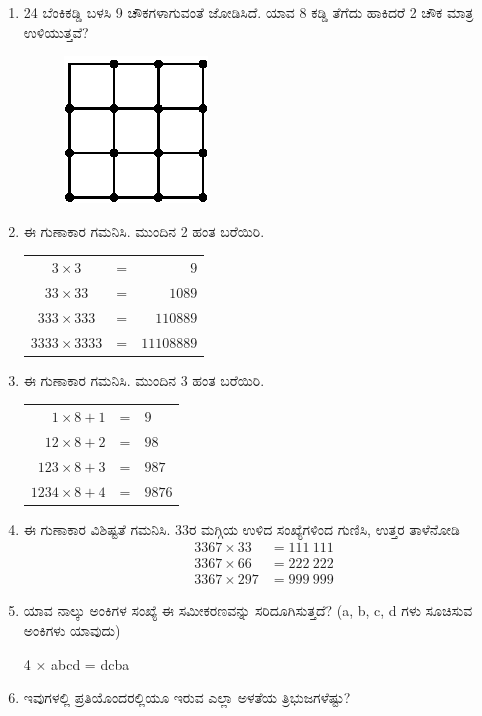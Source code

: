 \begin{enumerate}
\item 24 ಬೆಂಕಿಕಡ್ಡಿ ಬಳಸಿ 9 ಚೌಕಗಳಾಗುವಂತೆ ಜೋಡಿಸಿದೆ. ಯಾವ 8 ಕಡ್ಡಿ ತೆಗೆದು ಹಾಕಿದರೆ 2 ಚೌಕ ಮಾತ್ರ ಉಳಿಯುತ್ತವೆ? 
\begin{figure}[H]
\centering
\includegraphics[scale=1.4]{images/chap3/q16.eps}
\end{figure}

\item ಈ ಗುಣಾಕಾರ ಗಮನಿಸಿ. ಮುಂದಿನ 2 ಹಂತ ಬರೆಯಿರಿ. 

\begin{tabular}[t]{ccr}
$3 \times 3$ & = & $9$\\
$33 \times 33$ & = & $1089$\\
$333 \times 333$ & = & $110889$\\
$3333 \times 3333$ & = & $11108889$
\end{tabular}

\item ಈ ಗುಣಾಕಾರ ಗಮನಿಸಿ. ಮುಂದಿನ 3 ಹಂತ ಬರೆಯಿರಿ. 

\begin{tabular}[t]{rcl}
$1 \times 8 + 1$ & = & $9$\\
$12 \times 8 + 2$ & = & $98$\\
$123 \times 8 + 3$ & = & $987$\\
$1234 \times 8 + 4$ & = & $9876$
\end{tabular}

\item ಈ ಗುಣಾಕಾರ ವಿಶಿಷ್ಟತೆ ಗಮನಿಸಿ. 33ರ ಮಗ್ಗಿಯ ಉಳಿದ ಸಂಖ್ಯೆಗಳಿಂದ ಗುಣಿಸಿ, ಉತ್ತರ ತಾಳೆನೋಡಿ 
\begin{align*}
3367 \times 33 & = 111~111\\[-0.2cm]
3367 \times 66 & = 222~222\\[0.2cm]
3367 \times 297 & = 999~999
\end{align*}

\item ಯಾವ ನಾಲ್ಕು ಅಂಕಿಗಳ ಸಂಖ್ಯೆ ಈ ಸಮೀಕರಣವನ್ನು ಸರಿದೂಗಿಸುತ್ತದೆ? (a, b, c, d ಗಳು ಸೂಚಿಸುವ ಅಂಕಿಗಳು ಯಾವುದು)

4 $\times$ abcd = dcba

\eject

\item ಇವುಗಳಲ್ಲಿ ಪ್ರತಿಯೊಂದರಲ್ಲಿಯೂ ಇರುವ ಎಲ್ಲಾ ಅಳತೆಯ ತ್ರಿಭುಜಗಳೆಷ್ಟು?


\end{enumerate}
